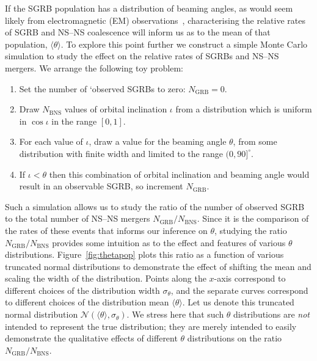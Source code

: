 \documentclass[twocolumn,nofootinbib]{revtex4-1}
\newcommand{\BNS}{\ac{NS}--\ac{NS}\xspace}
\def\electro#1{electromagnetic#1 (EM#1)\gdef\electro{EM}}
\begin{document}
If the \ac{SGRB} population has a distribution of beaming angles, as would seem
likely from \electro{} observations~\cite{Fong:2015oha}, characterising the
relative rates of \ac{SGRB} and \BNS coalescence will inform us as to the mean
of that population, $\langle \theta \rangle$.  To explore this point further we
construct a simple Monte Carlo simulation to study the effect on the relative
rates of \acp{SGRB} and \BNS mergers. We arrange the following toy problem:
%
\begin{enumerate}
    \item Set the number of `observed \acp{SGRB} to zero: $N_{\mathrm{GRB}}=0$.
    \item Draw $N_{\mathrm{BNS}}$ values of orbital inclination $\iota$ from a distribution which is uniform in $\cos \iota$ in the range $[0,1]$.
    \item For each value of $\iota$, draw a value for the beaming angle $\theta$, from some distribution with finite width and limited to the range $(0,90]^{\circ}$.
    \item If $\iota<\theta$ then this combination of orbital inclination and beaming angle would result in an observable \ac{SGRB}, so increment $N_{\mathrm{GRB}}$.
\end{enumerate}
%
Such a simulation allows us to study the ratio of the number of
observed \ac{SGRB} to the total number of \BNS mergers
$N_{\mathrm{GRB}}/N_{\mathrm{BNS}}$.  Since it is the comparison of
the rates of these events that informs our inference on $\theta$,
studying the ratio $N_{\mathrm{GRB}}/N_{\mathrm{BNS}}$ provides some
intuition as to the effect and features of various $\theta$
distributions.  Figure~\ref{fig:thetapop} plots this ratio as a
function of various truncated normal distributions to demonstrate the
effect of shifting the mean and scaling the width of the distribution.
Points along the $x$-axis correspond to different choices of the
distribution width $\sigma_{\theta}$, and the separate curves
correspond to different choices of the distribution mean
$\langle \theta \rangle$.  Let us denote this truncated normal
distribution ${\mathcal N}(\langle \theta \rangle, \sigma_{\theta})$.
We stress here that such $\theta$ distributions are \emph{not}
intended to represent the true distribution; they are merely intended
to easily demonstrate the qualitative effects of different $\theta$
distributions on the ratio $N_{\mathrm{GRB}}/N_{\mathrm{BNS}}$.
\end{document}
